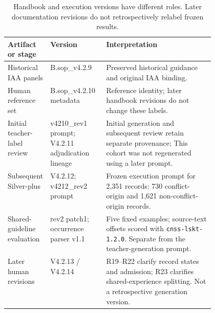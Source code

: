 \begin{table}[!htbp]
\centering
\caption{Handbook and execution versions have different roles. Later documentation revisions do not retrospectively relabel frozen results.}
\label{tab:handbook-versions}
\begin{tabularx}{\linewidth}{@{}P{0.20\linewidth}P{0.27\linewidth}L@{}}
\toprule
Artifact or stage & Version & Interpretation \\
\midrule
Historical IAA panels & B.sop\_v4.2.9 & Preserved historical guidance and original IAA binding. \\
Human reference set & B.sop\_v4.2.10 metadata & Reference identity; later handbook revisions do not change these labels. \\
Initial teacher-label review & v4210\_rev1 prompt; V4.2.11 adjudication lineage & Initial generation and subsequent review retain separate provenance; This cohort was not regenerated using a later prompt. \\
Subsequent Silver-plus & V4.2.12; v4212\_rev2 prompt & Frozen execution prompt for 2,351 records: 730 conflict-origin and 1,621 non-conflict-origin records. \\
Shared-guideline evaluation & rev2 patch1; occurrence parser v1.1 & Five fixed examples; source-text offsets scored with \texttt{cnss-lskt-1.2.0}. Separate from the teacher-generation prompt. \\
Later human revisions & V4.2.13 / V4.2.14 & R19--R22 clarify record states and admission; R23 clarifies shared-experience splitting. Not a retrospective generation version. \\
\bottomrule
\end{tabularx}
\end{table}
